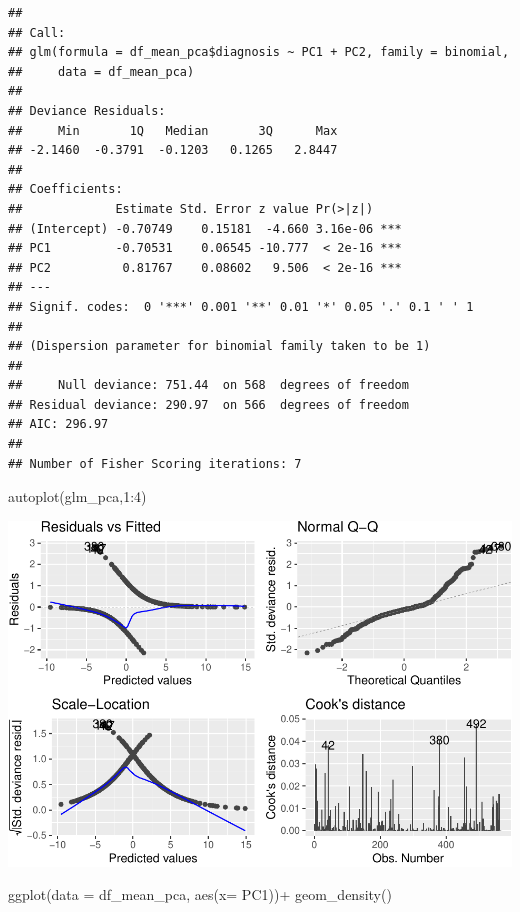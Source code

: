 \documentclass[
  11pt,
]{article}
\newenvironment{Shaded}{\begin{snugshade}}{\end{snugshade}}
\newcommand{\AttributeTok}[1]{\textcolor[rgb]{0.77,0.63,0.00}{#1}}
\newcommand{\DecValTok}[1]{\textcolor[rgb]{0.00,0.00,0.81}{#1}}
\newcommand{\FunctionTok}[1]{\textcolor[rgb]{0.00,0.00,0.00}{#1}}
\newcommand{\NormalTok}[1]{#1}
\newcommand{\SpecialCharTok}[1]{\textcolor[rgb]{0.00,0.00,0.00}{#1}}
\begin{document}
\begin{verbatim}
## 
## Call:
## glm(formula = df_mean_pca$diagnosis ~ PC1 + PC2, family = binomial, 
##     data = df_mean_pca)
## 
## Deviance Residuals: 
##     Min       1Q   Median       3Q      Max  
## -2.1460  -0.3791  -0.1203   0.1265   2.8447  
## 
## Coefficients:
##             Estimate Std. Error z value Pr(>|z|)    
## (Intercept) -0.70749    0.15181  -4.660 3.16e-06 ***
## PC1         -0.70531    0.06545 -10.777  < 2e-16 ***
## PC2          0.81767    0.08602   9.506  < 2e-16 ***
## ---
## Signif. codes:  0 '***' 0.001 '**' 0.01 '*' 0.05 '.' 0.1 ' ' 1
## 
## (Dispersion parameter for binomial family taken to be 1)
## 
##     Null deviance: 751.44  on 568  degrees of freedom
## Residual deviance: 290.97  on 566  degrees of freedom
## AIC: 296.97
## 
## Number of Fisher Scoring iterations: 7
\end{verbatim}

\begin{Shaded}
\begin{Highlighting}[]
\FunctionTok{autoplot}\NormalTok{(glm\_pca,}\DecValTok{1}\SpecialCharTok{:}\DecValTok{4}\NormalTok{)}
\end{Highlighting}
\end{Shaded}

\includegraphics{stat_DAP_files/figure-latex/unnamed-chunk-21-1.pdf}

\begin{Shaded}
\begin{Highlighting}[]
\FunctionTok{ggplot}\NormalTok{(}\AttributeTok{data =}\NormalTok{ df\_mean\_pca, }\FunctionTok{aes}\NormalTok{(}\AttributeTok{x=}\NormalTok{ PC1))}\SpecialCharTok{+} \FunctionTok{geom\_density}\NormalTok{()}
\end{Highlighting}
\end{Shaded}
\end{document}
